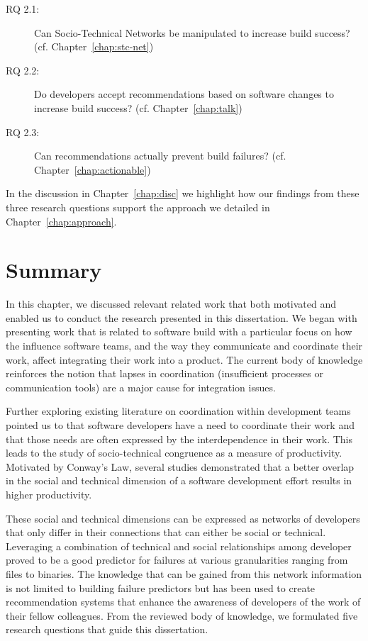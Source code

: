 \begin{description}
  \item[RQ 2.1:] Can Socio-Technical Networks be manipulated to increase build success? (cf. Chapter~\ref{chap:stc-net})
  \item[RQ 2.2:] Do developers accept recommendations based on software changes to increase build success? (cf. Chapter~\ref{chap:talk})
  \item[RQ 2.3:] Can recommendations actually prevent build failures? (cf. Chapter~\ref{chap:actionable})
\end{description}

In the discussion in Chapter~\ref{chap:disc} we highlight how our findings from these three research questions support the approach we detailed in Chapter~\ref{chap:approach}.


\section{Summary}
In this chapter, we discussed relevant related work that both motivated and enabled us to conduct the research presented in this dissertation.
We began with presenting work that is related to software build with a particular focus on how the influence software teams, and the way they communicate and coordinate their work, affect integrating their work into a product.
The current body of knowledge reinforces the notion that lapses in coordination (insufficient processes or communication tools) are a major cause for integration issues.

Further exploring existing literature on coordination within development teams pointed us to that software developers have a need to coordinate their work and that those needs are often expressed by the interdependence in their work.
This leads to the study of socio-technical congruence as a measure of productivity. 
Motivated by Conway's Law, several studies demonstrated that a better overlap in the social and technical dimension of a software development effort results in higher productivity.

These social and technical dimensions can be expressed as networks of developers that only differ in their connections that can either be social or technical.
Leveraging a combination of technical and social relationships among developer proved to be a good predictor for failures at various granularities ranging from files to binaries. 
The knowledge that can be gained from this network information is not limited to building failure predictors but has been used to create recommendation systems that enhance the awareness of developers of the work of their fellow colleagues.
From the reviewed body of knowledge, we formulated five research questions that guide this dissertation.





